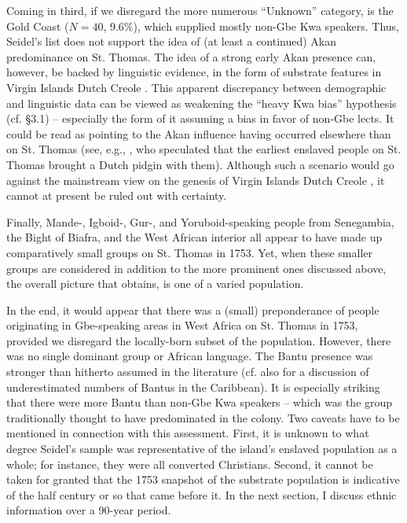 \documentclass[output=paper,colorlinks,citecolor=brown]{langscibook}
\begin{document}
Coming in third, if we disregard the more numerous ``Unknown'' category, is the Gold Coast ($N=40$, 9.6\%), which supplied mostly non-Gbe Kwa speakers. Thus, Seidel's list does not support the idea of (at least a continued) Akan predominance on St. Thomas. The idea of a strong early Akan presence can, however, be backed by linguistic evidence, in the form of substrate features in Virgin Islands Dutch Creole \citep[153]{Parkvall_2000}. This apparent discrepancy between demographic and linguistic data can be viewed as weakening the ``heavy Kwa bias'' hypothesis (cf. §3.1) – especially the form of it assuming a bias in favor of non-Gbe lects. It could be read as pointing to the Akan influence having occurred elsewhere than on St. Thomas (see, e.g., \cite{Goodman_1985}, who speculated that the earliest enslaved people on St. Thomas brought a Dutch pidgin with them). Although such a scenario would go against the mainstream view on the genesis of Virgin Islands Dutch Creole \citep[see][199]{Sabino_2012}, it cannot at present be ruled out with certainty.

Finally, Mande-, Igboid-, Gur-, and Yoruboid-speaking people from Senegambia, the Bight of Biafra, and the West African interior all appear to have made up comparatively small groups on St. Thomas in 1753. Yet, when these smaller groups are considered in addition to the more prominent ones discussed above, the overall picture that obtains, is one of a varied population.


In the end, it would appear that there was a (small) preponderance of people originating in Gbe-speaking areas in West Africa on St. Thomas in 1753, provided we disregard the locally-born subset of the population. However, there was no single dominant group or African language. The Bantu presence was stronger than hitherto assumed in the literature (cf. also \cite{Bakker_2016a} for a discussion of underestimated numbers of Bantus in the Caribbean). It is especially striking that there were more Bantu than non-Gbe Kwa speakers – which was the group traditionally thought to have predominated in the colony. Two caveats have to be mentioned in connection with this assessment. First, it is unknown to what degree Seidel's sample was representative of the island’s enslaved population as a whole; for instance, they were all converted Christians. Second, it cannot be taken for granted that the 1753 snapshot of the substrate population is indicative of the half century or so that came before it. In the next section, I discuss ethnic information over a 90-year period.
\end{document}
